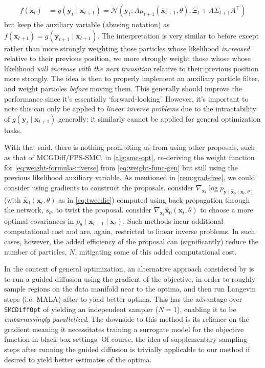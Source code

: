 \begin{align*}
    f(\tilde{\mathbf{x}}_t) &= g(\mathbf{y}_t \mid \mathbf{x}_{t+1}) = \mathcal{N}\left(\mathbf{y}_t; A\mu_{t+1}(\mathbf{x}_{t+1}, \theta), \Xi_t + A\Sigma_{t+1}A^\top\right)
\end{align*}
but keep the auxiliary variable (abusing notation) as
$f(\mathbf{x}_{t+1}) = g(\mathbf{y}_{t+1} \mid \mathbf{x}_{t+1})$. The interpretation is very
similar to before except rather than more strongly weighting those particles whose likelihood
\emph{increased} relative to their previous position, we more strongly weight those whose whose
likelihood \emph{will increase with the next transition} relative to their previous position more
strongly. The idea is then to properly implement an auxiliary particle filter, and weight particles
\emph{before} moving them. This generally should improve the performance since it's essentially
`forward-looking'. However, it's important to note this can only be applied to \emph{linear
inverse problems} due to the intractability of $g(\mathbf{y}_t \mid \mathbf{x}_{t+1})$ generally;
it similarly cannot be applied for general optimization tasks.

With that said, there is nothing prohibiting us from using other proposals, such as that of
MCGDiff/FPS-SMC, in \autoref{alg:smc-opt}, re-deriving the weight function for
\autoref{eq:weight-formula-inverse} from \autoref{eq:weight-func-gen} but still using the previous
likelihood auxiliary variable. As mentioned in \autoref{rem:grad-free}, we could consider using
gradients to construct the proposals. \textcite{wuPracticalAsymptoticallyExact2023} consider
$\nabla_{\mathbf{x}_t}\log p_{\mathbf{y} \mid \hat{\mathbf{x}}_0(\mathbf{x}_t, \theta)}$ (with
$\hat{\mathbf{x}}_0(\mathbf{x}_t, \theta)$ as in \autoref{eq:tweedie}) computed using back-propagation
through the network, $s_\theta$, to twist the proposal. \textcite{boysTweedieMomentProjected2023}
consider $\nabla_{\mathbf{x}_t}\hat{\mathbf{x}}_0(\mathbf{x}_t, \theta)$ to choose a more optimal
covariances in $p_\theta(\mathbf{x}_{t-1} \mid \mathbf{x}_t)$. Such methods incur additional
computational cost and are, again, restricted to linear inverse problems. In such cases, however,
the added efficiency of the proposal can (significantly) reduce the number of particles, $N$,
mitigating some of this added computational cost.

In the context of general optimization, an alternative approach considered by
\textcite{kongDiffusionModelsConstrained2024}
is to run a guided diffusion using the gradient of the objective, in order to roughly sample regions
on the data manifold near to the optima, and then run Langevin steps (i.e. MALA) after to yield
better optima. This has the advantage over \texttt{SMCDiffOpt} of yielding an independent sampler
($N=1$), enabling it to be \emph{embarrassingly parallelized}. The downside to this method is its
reliance on the gradient meaning it necessitates training a surrogate model for the objective
function in black-box settings. Of course, the idea of supplementary sampling steps after running
the guided diffusion is trivially applicable to our method if desired to yield better estimates of
the optima.
